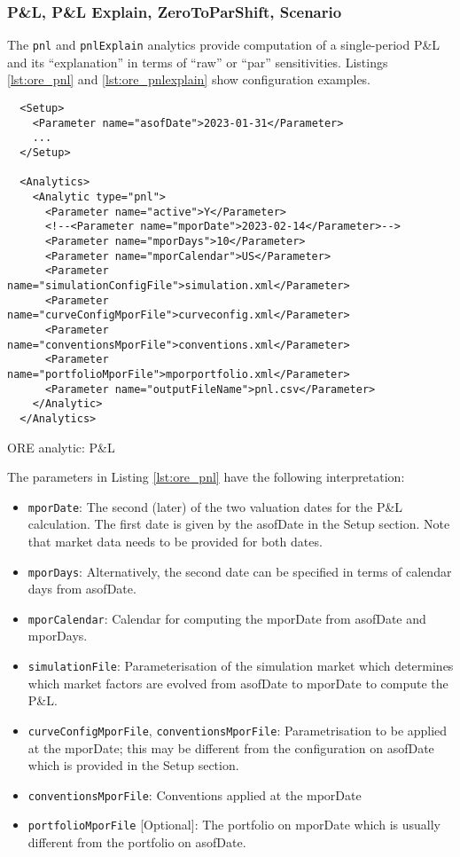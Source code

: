{\subsubsection{P\&L, P\&L Explain, ZeroToParShift, Scenario}

The {\tt pnl} and {\tt pnlExplain} analytics provide computation of a single-period P\&L and its
``explanation'' in terms of ``raw'' or ``par'' sensitivities. Listings \ref{lst:ore_pnl} and
\ref{lst:ore_pnlexplain} show configuration examples.

\begin{listing}[H]
\begin{verbatim}
  <Setup>
    <Parameter name="asofDate">2023-01-31</Parameter>
    ...
  </Setup>

  <Analytics>
    <Analytic type="pnl">
      <Parameter name="active">Y</Parameter>
      <!--<Parameter name="mporDate">2023-02-14</Parameter>-->
      <Parameter name="mporDays">10</Parameter>
      <Parameter name="mporCalendar">US</Parameter>
      <Parameter name="simulationConfigFile">simulation.xml</Parameter>
      <Parameter name="curveConfigMporFile">curveconfig.xml</Parameter>
      <Parameter name="conventionsMporFile">conventions.xml</Parameter>
      <Parameter name="portfolioMporFile">mporportfolio.xml</Parameter>
      <Parameter name="outputFileName">pnl.csv</Parameter>
    </Analytic>
  </Analytics>
\end{verbatim}
\caption{ORE analytic: P\&L}
\label{lst:ore_pnl}
\end{listing}

The parameters in Listing \ref{lst:ore_pnl} have the following interpretation:

\begin{itemize}
\item {\tt mporDate}: The second (later) of the two valuation dates for the P\&L calculation. The first date is given by the asofDate in the Setup section. Note that market data needs to be provided for both dates. 
\item {\tt mporDays}: Alternatively, the second date can be specified in terms of calendar days from asofDate.
\item {\tt mporCalendar}: Calendar for computing the mporDate from asofDate and mporDays.
\item {\tt simulationFile}: Parameterisation of the simulation market which determines which market factors are evolved from asofDate to mporDate to compute the P\&L.
\item {\tt curveConfigMporFile}, {\tt conventionsMporFile}: Parametrisation to be applied at the mporDate; this may be different from the configuration on asofDate which is provided in the Setup section.
\item {\tt conventionsMporFile}: Conventions applied at the mporDate
\item {\tt portfolioMporFile} [Optional]: The portfolio on mporDate which is usually different from the portfolio on asofDate.  
\end{itemize}

}
